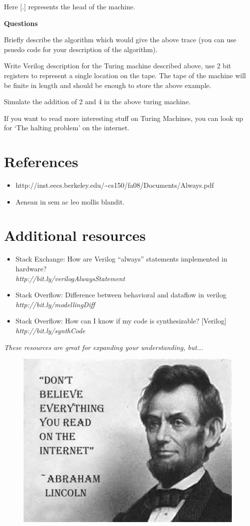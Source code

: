 \documentclass[a4paper,10pt]{article}
\theoremstyle{mytheor}
\begin{document}
{    Here \textsc{[.]} represents the head of the machine.
    
    \textbf{Questions}
    \begin{legal}
    \item Briefly describe the algorithm which would give the above
      trace (you can use psuedo code for your description of the
      algorithm).
    \item Write Verilog description for the Turing machine described
      above, use 2 bit registers to represent a single location on the
      tape. The tape of the machine will be finite in length and
      should be enough to store the above example.
    \item Simulate the addition of 2 and 4 in the above turing
      machine.
    \end{legal}
  If you want to read more interesting stuff on Turing Machines, you
  can look up for `The halting problem' on the internet.
 }

 \pagebreak
\section*{References}
\begin{itemize}
  \small
\item
  http://inst.eecs.berkeley.edu/{\textasciitilde}cs150/fa08/Documents/Always.pdf
\item Aenean in sem ac leo mollis blandit.
\end{itemize}

\section*{Additional resources}
\begin{itemize}
  \small 
\item Stack Exchange: How are Verilog “always” statements implemented
  in hardware? \\\textit{http://bit.ly/verilogAlwaysStatement}
\item Stack Overflow: Difference between behavioral and dataflow in
  verilog \\\textit{http://bit.ly/modellingDiff}
\item Stack Overflow: How can I know if my code is synthesizable?
  [Verilog] \\\textit{http://bit.ly/synthCode}
\end{itemize} 

\centerline{\textit{These resources are great for expanding your
    understanding, but...}}
\begin{centering}
  \begin{figure}[!h] \centering  
    \includegraphics[width=0.5\linewidth]{./resources/meme.jpeg} 
  \end{figure}  
\end{centering}
\end{document}

